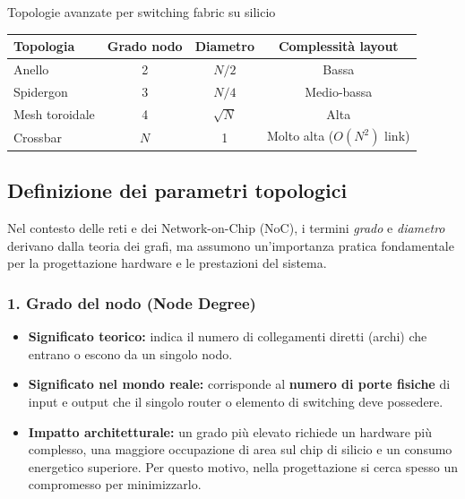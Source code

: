\documentclass[a4paper,12pt]{report}
\begin{document}
\begin{notebox}{Topologie avanzate per switching fabric su silicio}
\vspace{0.3cm}

\begin{center}
\begin{tabular}{lccc}
\toprule
\textbf{Topologia} & \textbf{Grado nodo} & \textbf{Diametro}
    & \textbf{Complessità layout} \\
\midrule
Anello        & 2 & $N/2$   & Bassa \\
Spidergon     & 3 & $N/4$   & Medio-bassa \\
Mesh toroidale & 4 & $\sqrt{N}$ & Alta \\
Crossbar      & $N$ & 1      & Molto alta ($O(N^2)$ link) \\
\bottomrule
\end{tabular}
\end{center}

\subsection*{Definizione dei parametri topologici}

Nel contesto delle reti e dei Network-on-Chip (NoC), i termini \emph{grado} e \emph{diametro} derivano dalla teoria dei grafi, ma assumono un'importanza pratica fondamentale per la progettazione hardware e le prestazioni del sistema.

\subsubsection*{1. Grado del nodo (Node Degree)}
\begin{itemize}
    \item \textbf{Significato teorico:} indica il numero di collegamenti diretti (archi) che entrano o escono da un singolo nodo.
    \item \textbf{Significato nel mondo reale:} corrisponde al \textbf{numero di porte fisiche} di input e output che il singolo router o elemento di switching deve possedere.
    \item \textbf{Impatto architetturale:} un grado più elevato richiede un hardware più complesso, una maggiore occupazione di area sul chip di silicio e un consumo energetico superiore. Per questo motivo, nella progettazione si cerca spesso un compromesso per minimizzarlo.
\end{itemize}


\end{notebox}
\end{document}
